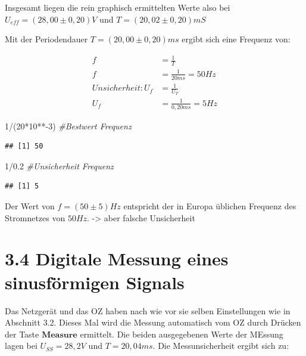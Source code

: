 \documentclass[
  9pt,
]{article}
\newenvironment{Shaded}{\begin{snugshade}}{\end{snugshade}}
\newcommand{\CommentTok}[1]{\textcolor[rgb]{0.56,0.35,0.01}{\textit{#1}}}
\newcommand{\DecValTok}[1]{\textcolor[rgb]{0.00,0.00,0.81}{#1}}
\newcommand{\FloatTok}[1]{\textcolor[rgb]{0.00,0.00,0.81}{#1}}
\newcommand{\NormalTok}[1]{#1}
\newcommand{\SpecialCharTok}[1]{\textcolor[rgb]{0.00,0.00,0.00}{#1}}
\begin{document}
Insgesamt liegen die rein graphisch ermittelten Werte also bei
\(U_{eff} = (28,00 \pm 0,20) V\) und \(T = (20,02 \pm 0,20) mS\)

Mit der Periodendauer \(T = (20,00 \pm 0,20) ms\) ergibt sich eine
Frequenz von:

\begin{equation*}
\begin{split}
f &= \frac{1}{T} \\
f &= \frac{1}{20ms} = 50 Hz \\
Unsicherheit: U_f &= \frac{1}{U_T} \\
U_f &= \frac{1}{0,20ms} = 5 Hz
\end{split}
\end{equation*}

\begin{Shaded}
\begin{Highlighting}[]
\DecValTok{1}\SpecialCharTok{/}\NormalTok{(}\DecValTok{20}\SpecialCharTok{*}\DecValTok{10}\SpecialCharTok{**{-}}\DecValTok{3}\NormalTok{) }\CommentTok{\#Bestwert Frequenz}
\end{Highlighting}
\end{Shaded}

\begin{verbatim}
## [1] 50
\end{verbatim}

\begin{Shaded}
\begin{Highlighting}[]
\DecValTok{1}\SpecialCharTok{/}\FloatTok{0.2} \CommentTok{\#Unsicherheit Frequenz}
\end{Highlighting}
\end{Shaded}

\begin{verbatim}
## [1] 5
\end{verbatim}

Der Wert von \(f= (50 \pm 5) Hz\) entspricht der in Europa üblichen
Frequenz des Stromnetzes von \(50 Hz\). -\textgreater{} aber falsche
Unsicherheit

\hypertarget{digitale-messung-eines-sinusfuxf6rmigen-signals}{%
\section{3.4 Digitale Messung eines sinusförmigen
Signals}\label{digitale-messung-eines-sinusfuxf6rmigen-signals}}

Das Netzgerät und das OZ haben nach wie vor sie selben Einstellungen wie
in Abschnitt 3.2. Dieses Mal wird die Messung automatisch vom OZ durch
Drücken der Taste \(\textbf{Measure}\) ermittelt. Die beiden
ausgegebenen Werte der MEssung lagen bei \(U_{SS} = 28,2 V\) und
\(T= 20,04ms\). Die Messunsicherheit ergibt sich zu:
\end{document}
